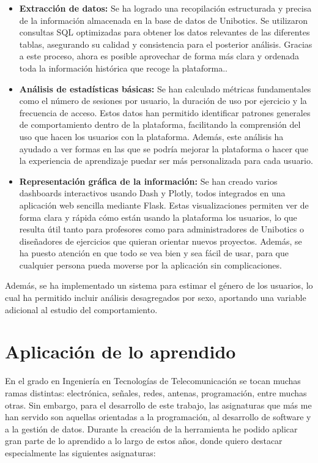 \documentclass[a4paper, 12pt]{book}
\begin{document}
\begin{itemize}
    \item \textbf{Extracción de datos:} Se ha logrado una recopilación estructurada y precisa de la información almacenada en la base de datos de Unibotics. Se utilizaron consultas SQL optimizadas para obtener los datos relevantes de las diferentes tablas, asegurando su calidad y consistencia para el posterior análisis. Gracias a este proceso, ahora es posible aprovechar de forma más clara y ordenada toda la información histórica que recoge la plataforma..
    
    \item \textbf{Análisis de estadísticas básicas:} Se han calculado métricas fundamentales como el número de sesiones por usuario, la duración de uso por ejercicio y la frecuencia de acceso. Estos datos han permitido identificar patrones generales de comportamiento dentro de la plataforma, facilitando la comprensión del uso que hacen los usuarios con la plataforma. Además, este análisis ha ayudado a ver formas en las que se podría mejorar la plataforma o hacer que la experiencia de aprendizaje puedar ser más personalizada para cada usuario.
    
    \item \textbf{Representación gráfica de la información:} Se han creado varios dashboards interactivos usando Dash y Plotly, todos integrados en una aplicación web sencilla mediante Flask. Estas visualizaciones permiten ver de forma clara y rápida cómo están usando la plataforma los usuarios, lo que resulta útil tanto para profesores como para administradores de Unibotics o diseñadores de ejercicios que quieran orientar nuevos proyectos. Además, se ha puesto atención en que todo se vea bien y sea fácil de usar, para que cualquier persona pueda moverse por la aplicación sin complicaciones.

\end{itemize}

Además, se ha implementado un sistema para estimar el género de los usuarios, lo cual ha permitido incluir análisis desagregados por sexo, aportando una variable adicional al estudio del comportamiento.

\section{Aplicación de lo aprendido}
\label{sec:aplicacion}

En el grado en Ingeniería en Tecnologías de Telecomunicación se tocan muchas ramas distintas: electrónica, señales, redes, antenas, programación, entre muchas otras. Sin embargo, para el desarrollo de este trabajo, las asignaturas que más me han servido son aquellas orientadas a la programación, al desarrollo de software y a la gestión de datos. Durante la creación de la herramienta he podido aplicar gran parte de lo aprendido a lo largo de estos años, donde quiero destacar especialmente las siguientes asignaturas:
\end{document}
